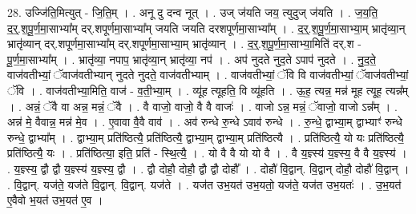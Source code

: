 \documentclass[17pt]{extarticle}
\begin{document}
28. उज्जि॑ति॒मित्युत् - जि॒ति॒म् । . अनू दु दन्व नूत् । . उज् ज॑यति जय॒ त्युदुज् ज॑यति । . ज॒य॒ति॒ द॒र्॒.श॒पू॒र्ण॒मा॒साभ्या᳚म् दर्.शपूर्णमा॒साभ्या᳚म् जयति जयति दरशपूर्णमा॒साभ्या᳚म् । . द॒र्॒.श॒पू॒र्ण॒मा॒साभ्या॒म् भ्रातृ॑व्या॒न् भ्रातृ॑व्यान् दर्.शपूर्णमा॒साभ्या᳚म् दर्.शपूर्णमा॒साभ्या॒म् भ्रातृ॑व्यान् । . द॒र्॒.श॒पू॒र्ण॒मा॒साभ्या॒मिति॑ दर्.श - पू॒र्ण॒मा॒साभ्या᳚म् । . भ्रातृ॑व्या॒ नपाप॒ भ्रातृ॑व्या॒न् भ्रातृ॑व्या॒ नप॑ । . अप॑ नुदते नुद॒ते ऽपाप॑ नुदते । . नु॒द॒ते॒ वाज॑वतीभ्यां॒ ॅवाज॑वतीभ्यान् नुदते नुदते॒ वाज॑वतीभ्याम् । . वाज॑वतीभ्यां॒ ॅवि वि वाज॑वतीभ्यां॒ ॅवाज॑वतीभ्यां॒ ॅवि । . वाज॑वतीभ्या॒मिति॒ वाज॑ - व॒ती॒भ्या॒म् । . व्यू॑ह त्यूहति॒ वि व्यू॑हति । . ऊ॒ह॒ त्यन्न॒ मन्न॑ मूह त्यूह॒ त्यन्न᳚म् । . अन्नं॒ ॅवै वा अन्न॒ मन्नं॒ ॅवै । . वै वाजो॒ वाजो॒ वै वै वाजः॑ । . वाजो ऽन्न॒ मन्नं॒ ॅवाजो॒ वाजो ऽन्न᳚म् । . अन्न॑ मे॒ वैवान्न॒ मन्न॑ मे॒व । . ए॒वावा वै॒वै वाव॑ । . अव॑ रुन्धे रु॒न्धे ऽवाव॑ रुन्धे । . रु॒न्धे॒ द्वाभ्या॒म् द्वाभ्याꣳ॑ रुन्धे रुन्धे॒ द्वाभ्या᳚म् । . द्वाभ्या॒म् प्रति॑ष्ठित्यै॒ प्रति॑ष्ठित्यै॒ द्वाभ्या॒म् द्वाभ्या॒म् प्रति॑ष्ठित्यै । . प्रति॑ष्ठित्यै॒ यो यः प्रति॑ष्ठित्यै॒ प्रति॑ष्ठित्यै॒ यः । . प्रति॑ष्ठित्या॒ इति॒ प्रति॑ - स्थि॒त्यै॒ । . यो वै वै यो यो वै । . वै य॒ज्ञ्स्य॑ य॒ज्ञ्स्य॒ वै वै य॒ज्ञ्स्य॑ । . य॒ज्ञ्स्य॒ द्वौ द्वौ य॒ज्ञ्स्य॑ य॒ज्ञ्स्य॒ द्वौ । . द्वौ दोहौ॒ दोहौ॒ द्वौ द्वौ दोहौ᳚ । . दोहौ॑ वि॒द्वान्. वि॒द्वान् दोहौ॒ दोहौ॑ वि॒द्वान् । . वि॒द्वान्. यज॑ते॒ यज॑ते वि॒द्वान्. वि॒द्वान्. यज॑ते । . यज॑त उभ॒यत॑ उभ॒यतो॒ यज॑ते॒ यज॑त उभ॒यतः॑ । . उ॒भ॒यत॑ ए॒वैवो भ॒यत॑ उभ॒यत॑ ए॒व । \newline
\end{document}
